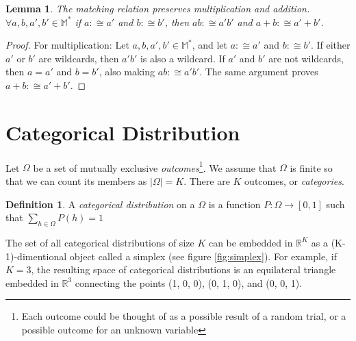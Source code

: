 \documentclass[twoside]{article}
\theoremstyle{plain}%
\newtheorem{lemma}[theorem]{Lemma}
\theoremstyle{definition}
\newtheorem{definition}{Definition}[section]
\theoremstyle{remark}
\begin{document}
\begin{lemma}
\label{lemma:matching_multiplication}
The matching relation preserves multiplication and addition. \(\forall a,b,a',b' \in \mathbb{M^*}\) if \(a :\cong a'\) and \(b :\cong b'\), then \(ab :\cong a'b'\) and \(a+b :\cong a'+b'\).
\end{lemma}

\begin{proof}
For multiplication: Let \(a,b,a',b' \in \mathbb{M^*}\), and let \(a :\cong a'\) and \(b :\cong b'\). If either \(a'\) or \(b'\) are wildcards, then \(a'b'\) is also a wildcard. If \(a'\) and \(b'\) are not wildcards, then \(a = a'\) and \(b = b'\), also making \(ab :\cong a'b'\).
The same argument proves \(a+b :\cong a'+b'\).
\end{proof}

\section{Categorical Distribution}

Let \(\Omega\) be a set of mutually exclusive \textit{outcomes}\footnote{Each outcome could be thought of as a possible result of a random trial, or a possible outcome for an unknown variable}. We assume that \(\Omega\) is finite so that we can count its members as \(|\Omega| = K\). There are \(K\) outcomes, or \textit{categories}.

\begin{definition}
\label{def:categorical_abs}
A \textit{categorical distribution} on a \(\Omega\) is a function \(P: \Omega \rightarrow [0, 1]\) such that \(\sum_{h \in \Omega} P(h) = 1\)
\end{definition}

The set of all categorical distributions of size \(K\) can be embedded in \(\mathbb{R}^K\) as a (K-1)-dimentional object called a simplex (see figure \ref{fig:simplex}). For example, if \(K = 3\), the resulting space of categorical distributions is an equilateral triangle embedded in \(\mathbb{R}^3\) connecting the points (1, 0, 0), (0, 1, 0), and (0, 0, 1).
\end{document}
